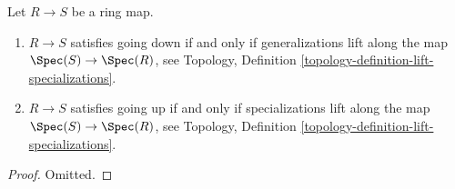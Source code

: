 \begin{lemma}
\label{lemma-going-up-down-specialization}
Let $R \to S$ be a ring map.
\begin{enumerate}
\item $R \to S$ satisfies going down if and only if
generalizations lift along the map $\Spec(S) \to \Spec(R)$,
see Topology, Definition \ref{topology-definition-lift-specializations}.
\item $R \to S$ satisfies going up if and only if
specializations lift along the map $\Spec(S) \to \Spec(R)$,
see Topology, Definition \ref{topology-definition-lift-specializations}.
\end{enumerate}
\end{lemma}

\begin{proof}
Omitted.
\end{proof}